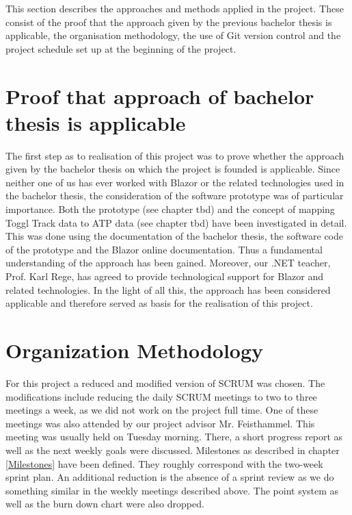 
This section describes the approaches and methods applied in the project. These consist of the proof that the
approach given by the previous bachelor thesis is applicable, the organisation methodology, the use of Git
version control and the project schedule set up at the beginning of the project.

\section{Proof that approach of bachelor thesis is applicable}
The first step as to realisation of this project was to prove whether the approach given by the bachelor thesis
on which the project is founded is applicable. Since neither one of us has ever worked with Blazor or the 
related technologies used in the bachelor thesis, the consideration of the software prototype was of particular
importance. Both the prototype (see chapter tbd) and the concept of mapping Toggl Track data to ATP data (see
chapter tbd) have been investigated in detail. This was done using the documentation of the bachelor thesis,
the software code of the prototype and the Blazor online documentation. Thus a fundamental understanding of the
approach has been gained. Moreover, our .NET teacher, Prof. Karl Rege, has agreed to provide technological support 
for Blazor and related technologies. In the light of all this, the approach has been considered applicable and
therefore served as basis for the realisation of this project.

\section{Organization Methodology}
For this project a reduced and modified version of SCRUM \cite{scrum_url} was chosen. The modifications include reducing the daily SCRUM meetings to two to three meetings a week, as we did not work on the project full time. One of these meetings was also attended by our project advisor Mr. Feisthammel. This meeting was usually held on Tuesday morning. There, a short progress report as well as the next weekly goals were discussed. Milestones as described in chapter \ref{Milestones} have been defined. They roughly correspond with the two-week sprint plan. An additional reduction is the absence of a sprint review as we do something similar in the weekly meetings described above. The point system as well as the burn down chart were also dropped.

